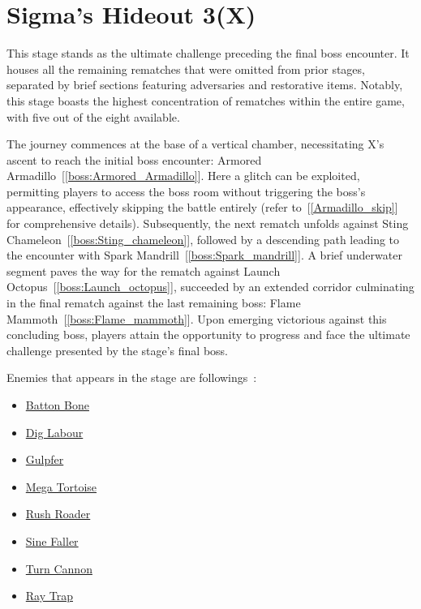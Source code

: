 \section{Sigma's Hideout 3(X)}
This stage stands as the ultimate challenge preceding the final boss encounter. It houses all the remaining rematches that were omitted from prior stages, separated by brief sections featuring adversaries and restorative items. Notably, this stage boasts the highest concentration of rematches within the entire game, with five out of the eight available.

The journey commences at the base of a vertical chamber, necessitating X's ascent to reach the initial boss encounter: Armored Armadillo~[\ref{boss:Armored_Armadillo}]. Here a glitch can be exploited, permitting players to access the boss room without triggering the boss's appearance, effectively skipping the battle entirely (refer to~[\ref{Armadillo_skip}] for comprehensive details). Subsequently, the next rematch unfolds against Sting Chameleon~[\ref{boss:Sting_chameleon}], followed by a descending path leading to the encounter with Spark Mandrill~[\ref{boss:Spark_mandrill}]. A brief underwater segment paves the way for the rematch against Launch Octopus~[\ref{boss:Launch_octopus}], succeeded by an extended corridor culminating in the final rematch against the last remaining boss: Flame Mammoth~[\ref{boss:Flame_mammoth}].
Upon emerging victorious against this concluding boss, players attain the opportunity to progress and face the ultimate challenge presented by the stage's final boss.

Enemies that appears in the stage are followings~\cite{wiki:sigma_stages}:
\begin{itemize}
	\item \hyperlink{enem:Batton_Bone}{Batton Bone}
	\item \hyperlink{enem:Dig_Labour}{Dig Labour}
	\item \hyperlink{enem:Gulpfer}{Gulpfer}
	\item \hyperlink{enem:Mega_Tortoise}{Mega Tortoise}
	\item \hyperlink{enem:Rush_Roader}{Rush Roader}
	\item \hyperlink{enem:Sine_Faller}{Sine Faller}
	\item \hyperlink{enem:Turn_Cannon}{Turn Cannon}
	\item \hyperlink{enem:Ray_Trap}{Ray Trap}
\end{itemize} 


